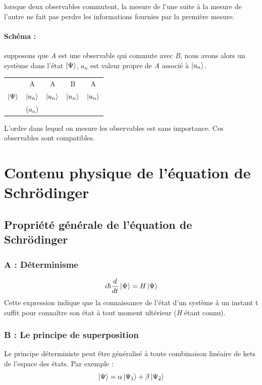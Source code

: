 \documentclass[12pt,a4paper,titlepage]{book}
\begin{document}
lorsque deux observables commutent, la mesure de l'une suite à la mesure de l'autre ne fait pas perdre les informations fournies par la première mesure.

\paragraph*{Schéma :}

supposons que \textit{A} est une observable qui commute avec \textit{B}, nous avons alors un système dans l'état $\ket\Psi$, $a_n$ est valeur propre de \textit{A} associé à $\ket{u_n}$.

\begin{table}[h!]
\begin{center}
\begin{tabular}{c|c|c|c|c}
& A & A & B & A\\
$\ket\Psi$ & $\ket{u_n}$ & $\ket{u_n}$ & $\ket{u_n}$ & $\ket{u_n}$\\
& ($a_n$) & & &
\end{tabular}
\end{center}
\end{table}

L'ordre dans lequel on mesure les observables est sans importance. Ces observables sont compatibles.

\section{Contenu physique de l'équation de Schrödinger}
\subsection{Propriété générale de l'équation de Schrödinger}
\subsubsection{A : Déterminisme}

\begin{equation*}
i \hbar \frac{d}{dt} \ket\Psi = H \ket\Psi
\end{equation*}
Cette expression indique que la connaissance de l'état d'un système à un instant t suffit pour connaître son état à tout moment ultérieur (\textit{H} étant connu).
\subsubsection{B : Le principe de superposition}
Le principe déterministe peut être généralisé à toute combinaison linéaire de kets de l'espace des états. Par exemple :
\begin{equation*}
\ket\Psi = \alpha \ket{\Psi_1} + \beta \ket{\Psi_2}
\end{equation*}
\end{document}
